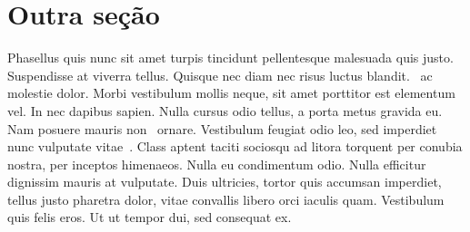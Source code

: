 \section{Outra seção}
Phasellus quis nunc sit amet turpis tincidunt pellentesque malesuada quis justo. Suspendisse at viverra tellus.
Quisque nec diam nec risus luctus blandit.\  ac molestie dolor. Morbi vestibulum mollis neque,
sit amet porttitor est elementum vel. In nec dapibus sapien. Nulla cursus odio tellus, a porta metus gravida eu.
Nam posuere mauris non\  ornare. Vestibulum feugiat odio leo, sed imperdiet nunc vulputate vitae\ \cite{sinopse2019es}.
Class aptent taciti sociosqu ad litora torquent per conubia nostra, per inceptos himenaeos. Nulla eu condimentum odio.
Nulla efficitur dignissim mauris at vulputate. Duis ultricies, tortor quis accumsan imperdiet, tellus justo pharetra dolor,
vitae convallis libero orci iaculis quam. Vestibulum quis felis eros. Ut ut tempor dui, sed consequat ex.
